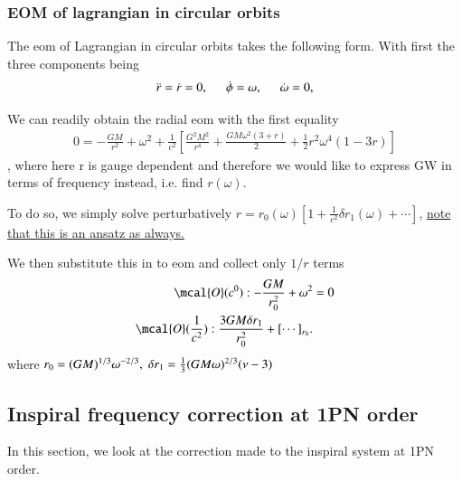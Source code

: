 \documentclass[a4paper, 12pt]{article}
\begin{document}
\subsubsection{EOM of lagrangian in circular orbits}%
  \label{sub:EOM of lagrangian in circular orbits}

  The eom of Lagrangian in circular orbits takes the following form. With
  first the three components being 
  \begin{align}
    \label{EOM of L in circular orbits}
    \ddot{r} = \dot{r} = 0, \hspace{0.5cm} \dot{\phi} = \omega,
    \hspace{0.5cm} \dot{\omega} = 0,
  \end{align}

  We can readily obtain the radial eom with the first equality 
  \begin{align}
    \label{final eom}
    0 = -\frac{GM}{r^2} + \omega^{2} + \frac{1}{c^2}[ \frac{G^2 M^2}{r^4}
    + \frac{GM \omega^2 (3 + r)}{2} + \frac{1}{2} r^2 \omega^4 (1-3r)] 
  \end{align}, where here r is gauge dependent and therefore we would like
  to express GW in terms of frequency instead, i.e. find \( r(\omega)  \). 

  To do so, we simply solve perturbatively \( r = r_0(\omega) [ 1 +
  \frac{1}{c^2} \delta r_{1}(\omega) + \cdots ] \),
  \underline{note that this is an ansatz as always.}

    We then substitute this in to eom and collect only \( 1/r \) terms 
    \begin{align}
      \label{final perturbation with eom r}
      \mcal{O}(c^0): -\frac{GM}{r_{0}^{2}} + \omega^2 &= 0 \\ 
      \mcal{O}(\frac{1}{c^2}): \frac{3GM \delta r_1}{r_{0}^{2}} +
      [\cdots]_{r_0}. 
    \end{align}
where \( r_0 = (GM)^{1/3} \omega^{-2/3}, \hspace{0.1cm} \delta r_1 =
\frac{1}{3} (GM\omega)^{2/3} (\nu-3)    \)

\subsection{Inspiral frequency correction at 1PN order}%
  \label{sub:Inspiral frequency correction at 1PN order}
  In this section, we look at the correction made to the inspiral
  system at 1PN order. 
\end{document}
